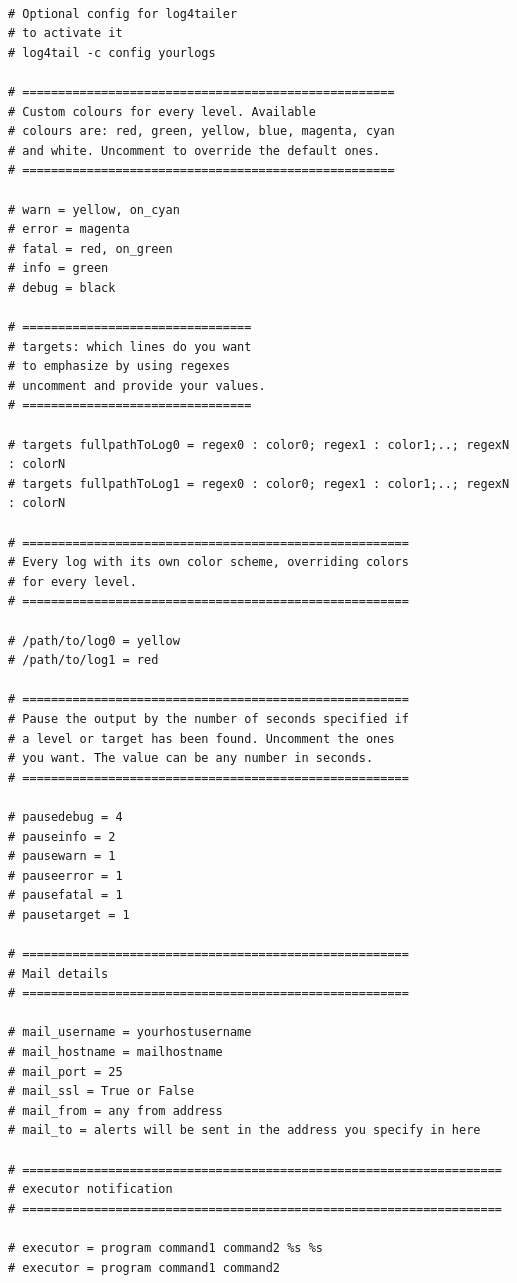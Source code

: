 \begin{verbatim}

# Optional config for log4tailer
# to activate it
# log4tail -c config yourlogs

# ====================================================
# Custom colours for every level. Available 
# colours are: red, green, yellow, blue, magenta, cyan 
# and white. Uncomment to override the default ones.
# ====================================================

# warn = yellow, on_cyan
# error = magenta 
# fatal = red, on_green
# info = green
# debug = black

# ================================
# targets: which lines do you want 
# to emphasize by using regexes
# uncomment and provide your values.
# ================================

# targets fullpathToLog0 = regex0 : color0; regex1 : color1;..; regexN : colorN
# targets fullpathToLog1 = regex0 : color0; regex1 : color1;..; regexN : colorN

# ======================================================
# Every log with its own color scheme, overriding colors 
# for every level.
# ======================================================

# /path/to/log0 = yellow
# /path/to/log1 = red

# ======================================================
# Pause the output by the number of seconds specified if 
# a level or target has been found. Uncomment the ones 
# you want. The value can be any number in seconds. 
# ======================================================

# pausedebug = 4
# pauseinfo = 2
# pausewarn = 1
# pauseerror = 1
# pausefatal = 1
# pausetarget = 1

# ======================================================
# Mail details 
# ======================================================

# mail_username = yourhostusername
# mail_hostname = mailhostname
# mail_port = 25
# mail_ssl = True or False
# mail_from = any from address
# mail_to = alerts will be sent in the address you specify in here

# ===================================================================
# executor notification
# ===================================================================

# executor = program command1 command2 %s %s
# executor = program command1 command2 


\end{verbatim}
